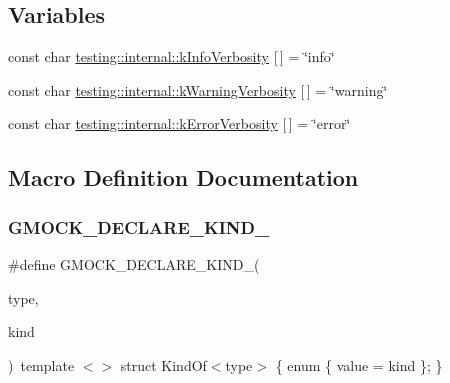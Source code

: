 \subsection*{Variables}
\begin{DoxyCompactItemize}
\item 
const char \mbox{\hyperlink{namespacetesting_1_1internal_a96274a788ffc75a6dffdfa8aa1f34fb9}{testing\+::internal\+::k\+Info\+Verbosity}} \mbox{[}$\,$\mbox{]} = \char`\"{}info\char`\"{}
\item 
const char \mbox{\hyperlink{namespacetesting_1_1internal_ad9386ccda6b6deac2f7b84784d3088c0}{testing\+::internal\+::k\+Warning\+Verbosity}} \mbox{[}$\,$\mbox{]} = \char`\"{}warning\char`\"{}
\item 
const char \mbox{\hyperlink{namespacetesting_1_1internal_a3d730761274e7b80dd66e5014171fcb5}{testing\+::internal\+::k\+Error\+Verbosity}} \mbox{[}$\,$\mbox{]} = \char`\"{}error\char`\"{}
\end{DoxyCompactItemize}


\subsection{Macro Definition Documentation}
\mbox{\label{gmock-internal-utils_8h_a7d8a1871d7a30543a4e1882a8b2bbcd8}} 
\subsubsection{\texorpdfstring{GMOCK\_DECLARE\_KIND\_}{GMOCK\_DECLARE\_KIND\_}}
{\footnotesize\ttfamily \#define G\+M\+O\+C\+K\+\_\+\+D\+E\+C\+L\+A\+R\+E\+\_\+\+K\+I\+N\+D\+\_\+(\begin{DoxyParamCaption}\item[{}]{type,  }\item[{}]{kind }\end{DoxyParamCaption})~template $<$$>$ struct Kind\+Of$<$type$>$ \{ enum \{ value = kind \}; \}}

\mbox{\label{gmock-internal-utils_8h_a8ee49a1af821b48fd83849c050d0d5a2}} 
